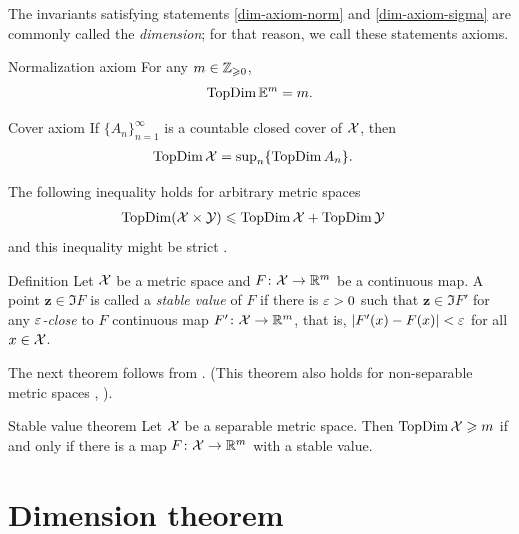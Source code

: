The invariants satisfying statements \ref{dim-axiom-norm} and \ref{dim-axiom-sigma} are commonly called the \emph{dimension};
for that reason, we call these statements axioms.

\begin{thm}{Normalization axiom}
\label{dim-axiom-norm} For any $m\in\mathbb{Z}_{\geqslant0}$,
\[\mathop{\rm TopDim}\nolimits\mathbb{E}^m=m.\]

\end{thm}

\begin{thm}{Cover axiom}\label{dim-axiom-sigma} 
If $\{A_n\}_{n=1}^\infty$ is a countable closed cover of $\mathcal{X}$, then
\begin{align*}
\mathop{\rm TopDim}\nolimits \mathcal{X}&=\sup\nolimits_n\{\mathop{\rm TopDim}\nolimits A_n\}.
\end{align*}

\end{thm}

The following inequality holds for arbitrary metric spaces
\begin{align*}
\mathop{\rm TopDim}\nolimits (\mathcal{X}\times\mathcal{Y})
&\leqslant 
\mathop{\rm TopDim}\nolimits \mathcal{X}+ \mathop{\rm TopDim}\nolimits\mathcal{Y}
\end{align*}
and this inequality might be strict \cite{pontyagin-surface}.

\medskip

\begin{thm}{Definition}
Let $\mathcal{X}$ be a metric space
and $F\colon\mathcal{X}\to\mathbb{R}^m$ be a continuous map.
A point $\bm{z}\in \Im F$ is called a \emph{stable value} of $F$
if there is $\varepsilon>0$ such that $\bm{z}\in\Im F'$ 
for any \emph{$\varepsilon$-close} to $F$ continuous map $F'\colon\mathcal{X}\to\mathbb{R}^m$,
that is, $|F'(x)-F(x)|<\varepsilon$ for all $x\in \mathcal{X}$.
\end{thm}



The next theorem follows from \cite[theorems VI 1$\&$2]{hurewicz-wallman}.
(This theorem also holds for non-separable metric spaces \cite{nagata}, \cite[3.2.10]{engelking}). 

{\sloppy

\begin{thm}{Stable value theorem}\label{thm:stable-value}
Let $\mathcal{X}$ be a separable metric space.
Then $\mathop{\rm TopDim}\nolimits\mathcal{X}\geqslant m$ if and only if there is a map $F\colon\mathcal{X}\to\mathbb{R}^m$ with a stable value.
\end{thm}

}

\section{Dimension theorem}\label{sec:dim-CAT}

